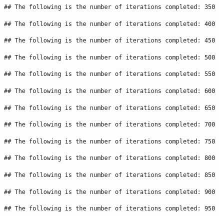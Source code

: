 \documentclass[
  12pt,
]{article}
\begin{document}
\begin{verbatim}
## The following is the number of iterations completed: 350
\end{verbatim}

\begin{verbatim}
## The following is the number of iterations completed: 400
\end{verbatim}

\begin{verbatim}
## The following is the number of iterations completed: 450
\end{verbatim}

\begin{verbatim}
## The following is the number of iterations completed: 500
\end{verbatim}

\begin{verbatim}
## The following is the number of iterations completed: 550
\end{verbatim}

\begin{verbatim}
## The following is the number of iterations completed: 600
\end{verbatim}

\begin{verbatim}
## The following is the number of iterations completed: 650
\end{verbatim}

\begin{verbatim}
## The following is the number of iterations completed: 700
\end{verbatim}

\begin{verbatim}
## The following is the number of iterations completed: 750
\end{verbatim}

\begin{verbatim}
## The following is the number of iterations completed: 800
\end{verbatim}

\begin{verbatim}
## The following is the number of iterations completed: 850
\end{verbatim}

\begin{verbatim}
## The following is the number of iterations completed: 900
\end{verbatim}

\begin{verbatim}
## The following is the number of iterations completed: 950
\end{verbatim}
\end{document}
